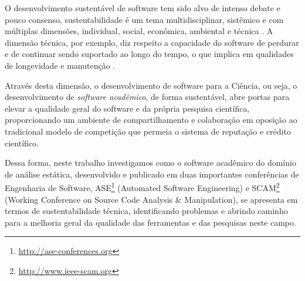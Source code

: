 

O desenvolvimento sustentável de software tem sido alvo de intenso debate e
pouco consenso, sustentabilidade é um tema multidisciplinar, sistêmico e com
múltiplas dimensões, individual, social, econômica, ambiental e técnica
\cite{becker2014karlskrona}. A dimensão técnica, por exemplo, diz respeito a
capacidade do software de perdurar e de continuar sendo suportado ao longo do
tempo, o que implica em qualidades de longevidade e manutenção
\cite{venters2014software}.

Através desta dimensão, o desenvolvimento de software para a Ciência, ou seja,
o desenvolvimento de {\it software acadêmico}, de forma sustentável, abre portas para elevar a qualidade
geral do software e da própria pesquisa científica, proporcionando um
ambiente de compartilhamento e colaboração em oposição ao tradicional modelo de
competição que permeia o sistema de reputação e crédito científico.

Dessa forma, neste trabalho investigamos como o software acadêmico do domínio
de análise estática, desenvolvido e publicado em duas importantes conferências
de Engenharia de Software, ASE\footnote{\url{http://ase-conferences.org}} (Automated Software Engineering) e SCAM\footnote{\url{http://www.ieee-scam.org}} (Working
Conference on Source Code Analysis \& Manipulation), se apresenta em termos de
sustentabilidade técnica, identificando problemas e abrindo caminho para a
melhoria geral da qualidade das ferramentas e das pesquisas neste campo.



